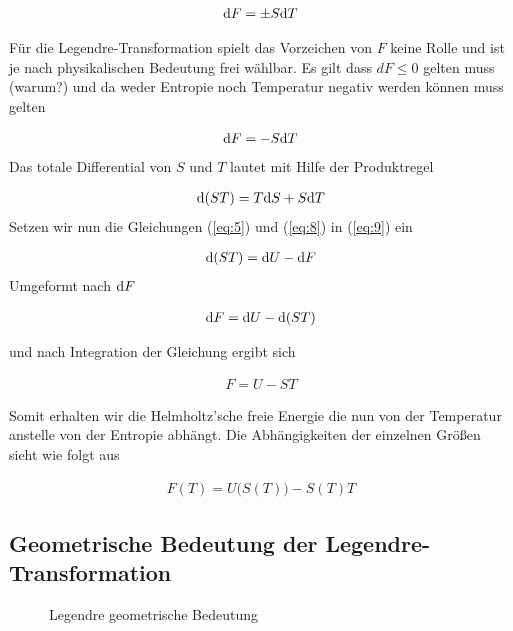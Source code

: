 \begin{align}
  \label{eq:7}
  \diff F = \pm S \diff T
\end{align}

Für die Legendre-Transformation spielt das Vorzeichen von \(F\) keine Rolle und ist je nach physikalischen Bedeutung frei wählbar. Es gilt dass \(dF\le 0\) gelten muss (warum?) und da weder Entropie noch Temperatur negativ werden können muss gelten

\begin{align}
  \label{eq:8}
  \diff F = -S\diff T
\end{align}
Das totale Differential von \(S\) und \(T\) lautet mit Hilfe der Produktregel

\begin{align}
  \label{eq:9}
  \diff (ST) = T\diff S + S\diff T
\end{align}
Setzen wir nun die Gleichungen  (\ref{eq:5}) und (\ref{eq:8}) in (\ref{eq:9}) ein

\begin{align}
  \label{eq:10}
  \diff (ST) = \diff U - \diff F
\end{align}
Umgeformt nach \(\diff F\) 

\begin{align}
  \label{eq:11}
  \diff F = \diff U - \diff(ST)
\end{align}

und nach Integration der Gleichung ergibt sich

\begin{align}
  \label{eq:12}
\boxed{  F = U - ST }
\end{align}

Somit erhalten wir die Helmholtz’sche freie Energie die nun von der Temperatur anstelle von der Entropie abhängt. Die Abhängigkeiten der einzelnen Größen sieht wie folgt aus

\begin{align}
  \label{eq:13}
  F(T) = U\Big(S(T)\Big) - S(T)T
\end{align}

\subsection{Geometrische Bedeutung der Legendre-Transformation}


\begin{figure}
  \centering
    
  \caption{Legendre geometrische Bedeutung}
  \label{fig:1}
\end{figure}

